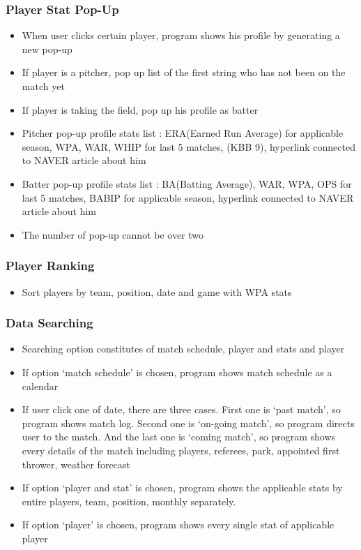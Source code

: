 \documentclass[conference,compsoc, twocolumn]{IEEEtran}
\begin{document}
\subsubsection{Player Stat Pop-Up}
\begin{itemize}
\item When user clicks certain player, program shows his profile by generating a new pop-up
\item If player is a pitcher, pop up list of the first string who has not been on the match yet
\item If player is taking the field, pop up his profile as batter
\item Pitcher pop-up profile stats list : ERA(Earned Run Average) for applicable season, WPA, WAR, WHIP for last 5 matches, (K\/BB 9), hyperlink connected to NAVER article about him
\item Batter pop-up profile stats list : BA(Batting Average), WAR, WPA, OPS for last 5 matches, BABIP for applicable season, \quad hyperlink connected to NAVER article about him
\item The number of pop-up cannot be over two
\end{itemize}

\subsubsection{Player Ranking}
\begin{itemize}
\item Sort players by team, position, date and game with WPA stats
\end{itemize}

\subsubsection{Data Searching}
\begin{itemize}
\item Searching option constitutes of match schedule, player and stats and player
\item If option ‘match schedule’ is chosen, program shows match schedule as a calendar
\item If user click one of date, there are three cases. First one is ‘past match’, so program shows match log. Second one is ‘on-going match’, so program directs user to the match. And the last one is ‘coming match’, so program shows every details of  the match including players, referees, park,  appointed first thrower, weather forecast 
\item If option ‘player and stat’ is chosen, program shows the applicable stats by entire players, team, position, monthly separately.
\item If option ‘player’ is chosen, program shows every single stat of applicable player
\end{itemize}
\end{document}

